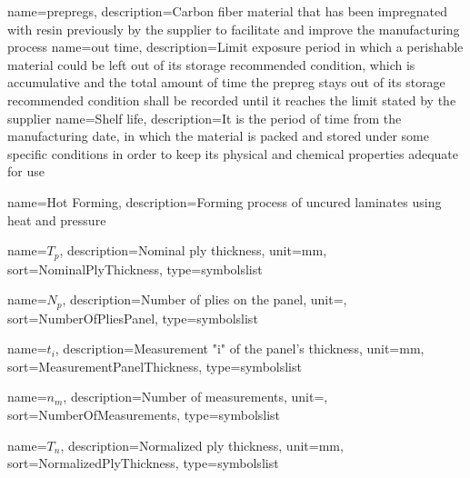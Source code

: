  {
	name={prepregs}, 
	description={Carbon fiber material that has been impregnated with resin previously by the supplier to facilitate and improve the manufacturing process}
}
 {
	name={out time}, 
	description={Limit exposure period in which a perishable material could be left out of its storage recommended condition, which is accumulative and the total amount of time the prepreg stays out of its storage recommended condition shall be recorded until it reaches the limit stated by the supplier}
}
 {
	name={Shelf life}, 
	description={It is the period of time from the manufacturing date, in which the material is packed and stored under some specific conditions in order to keep its physical and chemical properties adequate for use}
}

 {
	name={Hot Forming}, 
	description={Forming process of uncured laminates using heat and pressure}
}

\addto{\captionsportuguese}{
\renewcommand{\glossaryname}{Symbols List}
}

 {
	name=\ensuremath{T_{p}},
	description={Nominal ply thickness},
	unit={mm},
	sort=NominalPlyThickness,
	type=symbolslist
}

 {
	name=\ensuremath{N_{p}},
	description={Number of plies on the panel},
	unit={},
	sort=NumberOfPliesPanel,
	type=symbolslist
}

 {
	name=\ensuremath{t_{i}},
	description={Measurement "i" of the panel's thickness},
	unit={mm},
	sort=MeasurementPanelThickness,
	type=symbolslist
}

 {
	name=\ensuremath{n_{m}},
	description={Number of measurements},
	unit={},
	sort=NumberOfMeasurements,
	type=symbolslist
}

 {
	name=\ensuremath{T_{n}},
	description={Normalized ply thickness},
	unit={mm},
	sort=NormalizedPlyThickness,
	type=symbolslist
}

